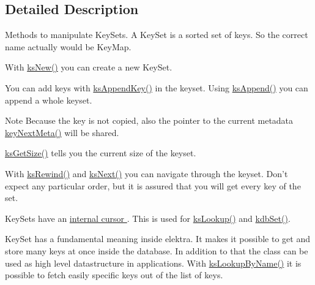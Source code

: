 \subsection{Detailed Description}
Methods to manipulate Key\-Sets. A Key\-Set is a sorted set of keys. So the correct name actually would be Key\-Map.

With \hyperlink{group__keyset_ga671e1aaee3ae9dc13b4834a4ddbd2c3c}{ks\-New()} you can create a new Key\-Set.

You can add keys with \hyperlink{group__keyset_gaa5a1d467a4d71041edce68ea7748ce45}{ks\-Append\-Key()} in the keyset. Using \hyperlink{group__keyset_ga21eb9c3a14a604ee3a8bdc779232e7b7}{ks\-Append()} you can append a whole keyset.

\begin{DoxyNote}{Note}
Because the key is not copied, also the pointer to the current metadata \hyperlink{group__keymeta_ga4c88342f580a4291455a801af71ce048}{key\-Next\-Meta()} will be shared. 
\end{DoxyNote}


\hyperlink{group__keyset_ga7474ad6b0a0fa969dbdf267ba5770eee}{ks\-Get\-Size()} tells you the current size of the keyset.

With \hyperlink{group__keyset_gabe793ff51f1728e3429c84a8a9086b70}{ks\-Rewind()} and \hyperlink{group__keyset_ga317321c9065b5a4b3e33fe1c399bcec9}{ks\-Next()} you can navigate through the keyset. Don't expect any particular order, but it is assured that you will get every key of the set.

Key\-Sets have an \hyperlink{group__keyset_ga4287b9416912c5f2ab9c195cb74fb094}{internal cursor }. This is used for \hyperlink{group__keyset_gaa34fc43a081e6b01e4120daa6c112004}{ks\-Lookup()} and \hyperlink{group__kdb_ga11436b058408f83d303ca5e996832bcf}{kdb\-Set()}.

Key\-Set has a fundamental meaning inside elektra. It makes it possible to get and store many keys at once inside the database. In addition to that the class can be used as high level datastructure in applications. With \hyperlink{group__keyset_gad2e30fb6d4739d917c5abb2ac2f9c1a1}{ks\-Lookup\-By\-Name()} it is possible to fetch easily specific keys out of the list of keys.

